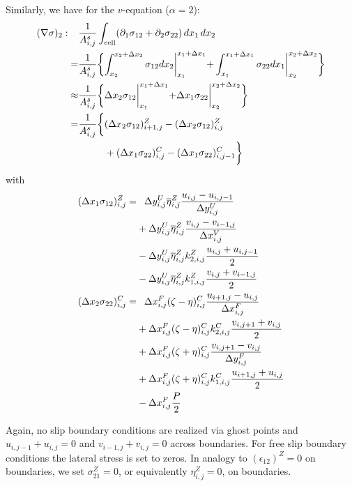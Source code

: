 Similarly, we have for the $v$-equation ($\alpha=2$):
\begin{align}
  (\nabla\sigma)_{2}: \phantom{=}&
  \frac{1}{A_{i,j}^s}
  \int_{\mathrm{cell}}(\partial_1\sigma_{12}+\partial_2\sigma_{22})\,dx_1\,dx_2 
  \\\notag
  =& \frac{1}{A_{i,j}^s} \biggl\{
  \int_{x_2}^{x_2+\Delta{x}_2}\sigma_{12}dx_2\biggl|_{x_{1}}^{x_{1}+\Delta{x}_{1}}
  + \int_{x_1}^{x_1+\Delta{x}_1}\sigma_{22}dx_1\biggl|_{x_{2}}^{x_{2}+\Delta{x}_{2}}
  \biggr\} \\ \notag
  \approx& \frac{1}{A_{i,j}^s} \biggl\{
  \Delta{x}_2\sigma_{12}\biggl|_{x_{1}}^{x_{1}+\Delta{x}_{1}}
  + \Delta{x}_1\sigma_{22}\biggl|_{x_{2}}^{x_{2}+\Delta{x}_{2}}
  \biggr\} \\ \notag
  =& \frac{1}{A_{i,j}^s} \biggl\{
  (\Delta{x}_2\sigma_{12})_{i+1,j}^Z - (\Delta{x}_2\sigma_{12})_{i,j}^Z
  \\ \notag
  \phantom{=}& \phantom{\frac{1}{A_{i,j}^s} \biggl\{}
  + (\Delta{x}_1\sigma_{22})_{i,j}^C - (\Delta{x}_1\sigma_{22})_{i,j-1}^C
  \biggr\} 
\end{align}
with
\begin{align}
  (\Delta{x}_1\sigma_{12})_{i,j}^Z =& \phantom{+}
  \Delta{y}_{i,j}^{U}\overline{\eta}^{Z}_{i,j}
  \frac{u_{i,j}-u_{i,j-1}}{\Delta{y}_{i,j}^{U}} 
  \\\notag &
  + \Delta{y}_{i,j}^{U}\overline{\eta}^{Z}_{i,j}
  \frac{v_{i,j}-v_{i-1,j}}{\Delta{x}_{i,j}^{V}} \\\notag
  &- \Delta{y}_{i,j}^{U}\overline{\eta}^{Z}_{i,j}
  k_{2,i,j}^{Z}\frac{u_{i,j}+u_{i,j-1}}{2} 
  \\\notag &
  - \Delta{y}_{i,j}^{U}\overline{\eta}^{Z}_{i,j}
  k_{1,i,j}^{Z}\frac{v_{i,j}+v_{i-1,j}}{2} \\ \notag
  (\Delta{x}_2\sigma_{22})_{i,j}^C =& \phantom{+}
  \Delta{x}_{i,j}^{F}(\zeta - \eta)^{C}_{i,j}
  \frac{u_{i+1,j}-u_{i,j}}{\Delta{x}_{i,j}^{F}} \\ \notag
  &+ \Delta{x}_{i,j}^{F}(\zeta - \eta)^{C}_{i,j}
  k_{2,i,j}^{C} \frac{v_{i,j+1}+v_{i,j}}{2} \\ \notag
  & + \Delta{x}_{i,j}^{F}(\zeta + \eta)^{C}_{i,j}
  \frac{v_{i,j+1}-v_{i,j}}{\Delta{y}_{i,j}^{F}} \\ \notag
  & + \Delta{x}_{i,j}^{F}(\zeta + \eta)^{C}_{i,j}
  k_{1,i,j}^{C}\frac{u_{i+1,j}+u_{i,j}}{2} \\ \notag
  & -\Delta{x}_{i,j}^{F} \frac{P}{2}
\end{align}

Again, no slip boundary conditions are realized via ghost points and
$u_{i,j-1}+u_{i,j}=0$ and $v_{i-1,j}+v_{i,j}=0$ across boundaries. For
free slip boundary conditions the lateral stress is set to zeros. In
analogy to $(\epsilon_{12})^Z=0$ on boundaries, we set
$\sigma_{21}^{Z}=0$, or equivalently $\eta_{i,j}^{Z}=0$, on boundaries.

